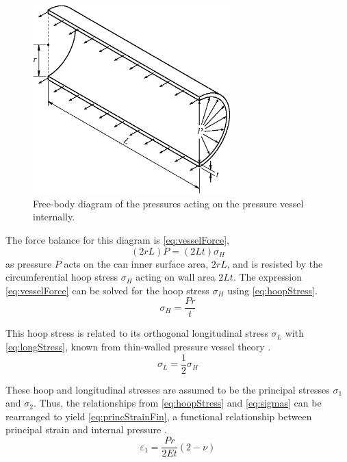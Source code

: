 \documentclass[10pt,journal,letterpaper]{IEEEtran}
\begin{document}
\begin{figure}[H]
\centering
\includegraphics[width=3in]{PVessel}
\caption{Free-body diagram of the pressures acting on the pressure vessel internally.}
\label{fig:PVessel}
\end{figure}

The force balance for this diagram is \eqref{eq:vesselForce},
\begin{equation}
\label{eq:vesselForce}
(2rL)P=(2Lt)\sigma_H
\end{equation}
as pressure $P$ acts on the can inner surface area, $2rL$, and is resisted by the circumferential hoop stress $\sigma_H$ acting on wall area $2Lt$.
The expression \eqref{eq:vesselForce} can be solved for the hoop stress $\sigma_H$ using \eqref{eq:hoopStress}.
\begin{equation}
\label{eq:hoopStress}
\sigma_H=\frac{Pr}{t}
\end{equation}

This hoop stress is related to its orthogonal longitudinal stress $\sigma_L$ with \eqref{eq:longStress}, known from thin-walled pressure vessel theory \cite{b1}.
\begin{equation}
\label{eq:longStress}
\sigma_L=\frac{1}{2}\sigma_H
\end{equation}

These hoop and longitudinal stresses are assumed to be the principal stresses $\sigma_1$ and $\sigma_2$.
Thus, the relationships from \eqref{eq:hoopStress} and \eqref{eq:sigmas} can be rearranged to yield \eqref{eq:princStrainFin}, a functional relationship between principal strain and internal pressure \cite{b1}.
\begin{equation}
\label{eq:princStrainFin}
\varepsilon_1=\frac{Pr}{2Et}(2-\nu)
\end{equation}
\end{document}
